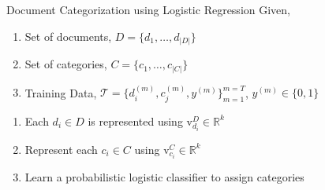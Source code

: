 \documentclass[10pt]{beamer}
\newcommand{\setD}{\ensuremath{D} }
\newcommand{\setC}{\ensuremath{C} }
\newcommand{\matD}{\ensuremath{\mathrm{D}} }
\newcommand{\matC}{\ensuremath{\mathrm{C}} }
\newcommand{\vecdi}[1]{\ensuremath{\mathrm{v}^{D}_{#1}}}
\newcommand{\vecci}[1]{\ensuremath{\mathrm{v}^{C}_{#1}}}
\newcommand{\traindata}{\ensuremath{\mathcal{T}}}
\begin{document}

\begin{frame}{Document Categorization using Logistic Regression}
Given,
\begin{enumerate}
	\vfill\item<1-> Set of documents, $\setD = \{d_{1}, \ldots, d_{|\setD|}\}$
	\vfill\item<1-> Set of categories, $\setC = \{c_{1}, \ldots, c_{|\setC|}\}$
	\vfill\item<1-> Training Data, $\traindata = \{ d^{(m)}_{i}, c^{(m)}_{j}, y^{(m)}\}^{m=T}_{m=1}$, $y^{(m)} \in \{0,1\}$
\end{enumerate}

\vfill{}

\begin{enumerate}
	\vfill\item<2-> Each $d_{i} \in \setD$ is represented using $\vecdi{d_{i}} \in \mathbb{R}^{k}$
	\vfill\item<2-> Represent each $c_{i} \in \setC$ using $\vecci{c_{i}} \in \mathbb{R}^{k}$
	\vfill\item<2-> Learn a probabilistic logistic classifier to assign categories
\end{enumerate}

\end{frame}

\end{document}
